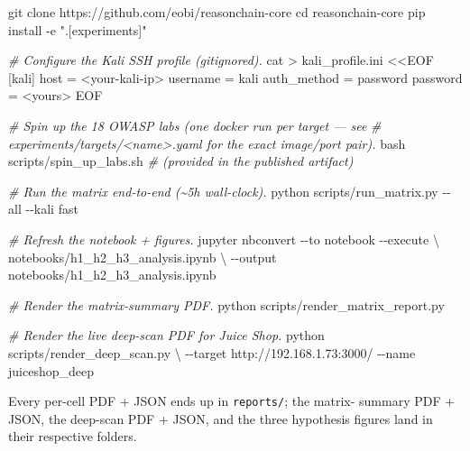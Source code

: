 \documentclass[
]{article}
\newenvironment{Shaded}{}{}
\newcommand{\AttributeTok}[1]{\textcolor[rgb]{0.49,0.56,0.16}{#1}}
\newcommand{\BuiltInTok}[1]{\textcolor[rgb]{0.00,0.50,0.00}{#1}}
\newcommand{\CommentTok}[1]{\textcolor[rgb]{0.38,0.63,0.69}{\textit{#1}}}
\newcommand{\DataTypeTok}[1]{\textcolor[rgb]{0.56,0.13,0.00}{#1}}
\newcommand{\ExtensionTok}[1]{#1}
\newcommand{\FunctionTok}[1]{\textcolor[rgb]{0.02,0.16,0.49}{#1}}
\newcommand{\NormalTok}[1]{#1}
\newcommand{\OperatorTok}[1]{\textcolor[rgb]{0.40,0.40,0.40}{#1}}
\newcommand{\StringTok}[1]{\textcolor[rgb]{0.25,0.44,0.63}{#1}}
\begin{document}
\begin{Shaded}
\begin{Highlighting}[]
\FunctionTok{git}\NormalTok{ clone https://github.com/eobi/reasonchain{-}core}
\BuiltInTok{cd}\NormalTok{ reasonchain{-}core}
\ExtensionTok{pip}\NormalTok{ install }\AttributeTok{{-}e} \StringTok{".[experiments]"}

\CommentTok{\# Configure the Kali SSH profile (gitignored).}
\FunctionTok{cat} \OperatorTok{\textgreater{}}\NormalTok{ kali\_profile.ini }\OperatorTok{\textless{}\textless{}EOF}
\StringTok{[kali]}
\StringTok{host = \textless{}your{-}kali{-}ip\textgreater{}}
\StringTok{username = kali}
\StringTok{auth\_method = password}
\StringTok{password = \textless{}yours\textgreater{}}
\OperatorTok{EOF}

\CommentTok{\# Spin up the 18 OWASP labs (one docker run per target — see}
\CommentTok{\# \textasciigrave{}experiments/targets/\textless{}name\textgreater{}.yaml\textasciigrave{} for the exact image/port pair).}
\FunctionTok{bash}\NormalTok{ scripts/spin\_up\_labs.sh   }\CommentTok{\# (provided in the published artifact)}

\CommentTok{\# Run the matrix end{-}to{-}end (\textasciitilde{}5h wall{-}clock).}
\ExtensionTok{python}\NormalTok{ scripts/run\_matrix.py }\AttributeTok{{-}{-}all} \AttributeTok{{-}{-}kali}\NormalTok{ fast}

\CommentTok{\# Refresh the notebook + figures.}
\ExtensionTok{jupyter}\NormalTok{ nbconvert }\AttributeTok{{-}{-}to}\NormalTok{ notebook }\AttributeTok{{-}{-}execute} \DataTypeTok{\textbackslash{}}
\NormalTok{    notebooks/h1\_h2\_h3\_analysis.ipynb }\DataTypeTok{\textbackslash{}}
    \AttributeTok{{-}{-}output}\NormalTok{ notebooks/h1\_h2\_h3\_analysis.ipynb}

\CommentTok{\# Render the matrix{-}summary PDF.}
\ExtensionTok{python}\NormalTok{ scripts/render\_matrix\_report.py}

\CommentTok{\# Render the live deep{-}scan PDF for Juice Shop.}
\ExtensionTok{python}\NormalTok{ scripts/render\_deep\_scan.py }\DataTypeTok{\textbackslash{}}
    \AttributeTok{{-}{-}target}\NormalTok{ http://192.168.1.73:3000/ }\AttributeTok{{-}{-}name}\NormalTok{ juiceshop\_deep}
\end{Highlighting}
\end{Shaded}

Every per-cell PDF + JSON ends up in \texttt{reports/}; the matrix-
summary PDF + JSON, the deep-scan PDF + JSON, and the three hypothesis
figures land in their respective folders.
\end{document}
